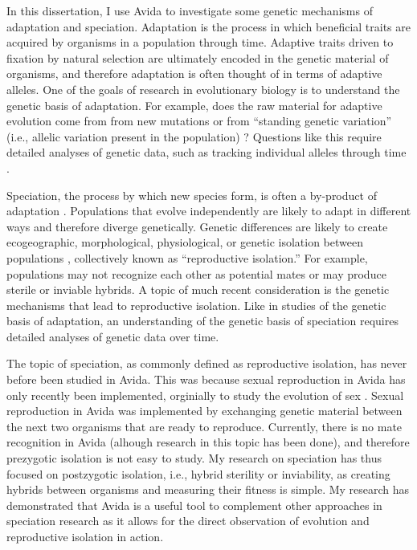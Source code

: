 \begin{doublespace}
In this dissertation, I use Avida to investigate
some genetic mechanisms of adaptation and speciation.
%
Adaptation is the process in which beneficial traits
are acquired by organisms in a population through time.
%
Adaptive traits driven to fixation by natural selection
are ultimately encoded in the genetic material of organisms,
and therefore adaptation is often thought of in terms of adaptive alleles.
%
One of the goals of research in evolutionary biology
is to understand the genetic basis of adaptation.
%
For example, does the raw material for adaptive evolution
come from from new mutations or from ``standing genetic variation''
(i.e., allelic variation present in the population) \citep{orr05}?
%
Questions like this require detailed analyses of genetic data,
such as tracking individual alleles through time \citep{bar08}.



Speciation, the process by which new species form,
is often a by-product of adaptation \citep{coy04,sch09,sob10}.
%
Populations that evolve independently are likely to adapt in different ways
and therefore diverge genetically.
%
Genetic differences are likely to create ecogeographic, morphological,
physiological, or genetic isolation between populations \citep{coy04,sch10},
collectively known as ``reproductive isolation.''
%
For example, populations may not recognize each other as potential mates
or may produce sterile or inviable hybrids.
%
A topic of much recent consideration
is the genetic mechanisms that lead to reproductive isolation.
%
Like in studies of the genetic basis of adaptation,
an understanding of the genetic basis of speciation
requires detailed analyses of genetic data over time.



The topic of speciation, as commonly defined as reproductive isolation,
has never before been studied in Avida.
%
This was because sexual reproduction in Avida has only recently
been implemented, orginially to study the evolution of sex
\citep{mis04,mis06,mis10}.
%
Sexual reproduction in Avida was implemented by exchanging genetic material
between the next two organisms that are ready to reproduce.
%
Currently, there is no mate recognition in Avida
(alhough research in this topic has been done),
and therefore prezygotic isolation is not easy to study.
%
My research on speciation has thus focused on postzygotic isolation,
i.e., hybrid sterility or inviability,
as creating hybrids between organisms and measuring their fitness is simple.
%
My research has demonstrated that Avida is a useful tool to complement
other approaches in speciation research as it allows for
the direct observation of evolution and reproductive isolation in action.




\end{doublespace}
